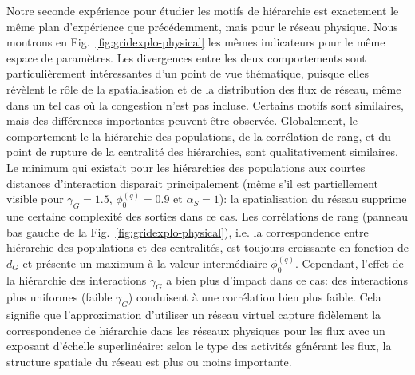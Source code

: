 \documentclass[english,fleqn,allpages]{ISTE_science}[2018/07/30]
\begin{document}
{Notre seconde expérience pour étudier les motifs de hiérarchie est exactement le même plan d'expérience que précédemment, mais pour le réseau physique. Nous montrons en Fig.~\ref{fig:gridexplo-physical} les mêmes indicateurs pour le même espace de paramètres. Les divergences entre les deux comportements sont particulièrement intéressantes d'un point de vue thématique, puisque elles révèlent le rôle de la spatialisation et de la distribution des flux de réseau, même dans un tel cas où la congestion n'est pas incluse. Certains motifs sont similaires, mais des différences importantes peuvent être observée. Globalement, le comportement le la hiérarchie des populations, de la corrélation de rang, et du point de rupture de la centralité des hiérarchies, sont qualitativement similaires. Le minimum qui existait pour les hiérarchies des populations aux courtes distances d'interaction disparait principalement (même s'il est partiellement visible pour  $\gamma_G = 1.5$, $\phi_0^{(q)} = 0.9$ et $\alpha_S = 1$): la spatialisation du réseau supprime une certaine complexité des sorties dans ce cas. Les corrélations de rang (panneau bas gauche de la Fig.~\ref{fig:gridexplo-physical}), i.e. la correspondence entre hiérarchie des populations et des centralités, est toujours croissante en fonction de $d_G$ et présente un maximum à la valeur intermédiaire $\phi_0^{(q)}$. Cependant, l'effet de la hiérarchie des interactions $\gamma_G$ a bien plus d'impact dans ce cas: des interactions plus uniformes (faible $\gamma_G$) conduisent à une corrélation bien plus faible. Cela signifie que l'approximation d'utiliser un réseau virtuel capture fidèlement la correspondence de hiérarchie dans les réseaux physiques pour les flux avec un exposant d'échelle superlinéaire: selon le type des activités générant les flux, la structure spatiale du réseau est plus ou moins importante.
}
\end{document}

